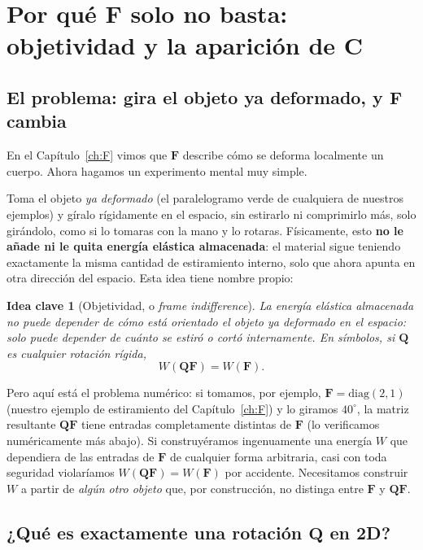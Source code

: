 \documentclass[11pt,a4paper]{article}
\newtheorem{takeaway}{Idea clave}
\begin{document}
\section{Por qu\'e $\bm F$ solo no basta: objetividad y la aparici\'on de $\bm C$}
\label{ch:C}

\subsection{El problema: gira el objeto ya deformado, y $\bm F$ cambia}

En el Cap\'itulo~\ref{ch:F} vimos que $\bm F$ describe c\'omo se
deforma localmente un cuerpo. Ahora hagamos un experimento mental muy
simple.

Toma el objeto \emph{ya deformado} (el paralelogramo verde de
cualquiera de nuestros ejemplos) y g\'iralo r\'igidamente en el
espacio, sin estirarlo ni comprimirlo m\'as, solo gir\'andolo, como
si lo tomaras con la mano y lo rotaras. F\'isicamente, esto \textbf{no
le a\~nade ni le quita energ\'ia el\'astica almacenada}: el material
sigue teniendo exactamente la misma cantidad de estiramiento interno,
solo que ahora apunta en otra direcci\'on del espacio. Esta idea tiene
nombre propio:

\begin{takeaway}[Objetividad, o \emph{frame indifference}]
La energ\'ia el\'astica almacenada no puede depender de c\'omo est\'a
orientado el objeto \emph{ya deformado} en el espacio: solo puede
depender de cu\'anto se estir\'o o cort\'o internamente. En s\'imbolos,
si $\bm Q$ es cualquier rotaci\'on r\'igida,
\[
 W(\bm Q\bm F)=W(\bm F).
\]
\end{takeaway}

Pero aqu\'i est\'a el problema num\'erico: si tomamos, por ejemplo,
$\bm F=\mathrm{diag}(2,1)$ (nuestro ejemplo de estiramiento del
Cap\'itulo~\ref{ch:F}) y lo giramos $40^\circ$, la matriz resultante
$\bm Q\bm F$ tiene entradas completamente distintas de $\bm F$ (lo
verificamos num\'ericamente m\'as abajo). Si construy\'eramos
ingenuamente una energ\'ia $W$ que dependiera de las entradas de
$\bm F$ de cualquier forma arbitraria, casi con toda seguridad
violar\'iamos $W(\bm Q\bm F)=W(\bm F)$ por accidente. Necesitamos
construir $W$ a partir de \emph{alg\'un otro objeto} que, por
construcci\'on, no distinga entre $\bm F$ y $\bm Q\bm F$.

\subsection{¿Qu\'e es exactamente una rotaci\'on $\bm Q$ en 2D?}
\end{document}
